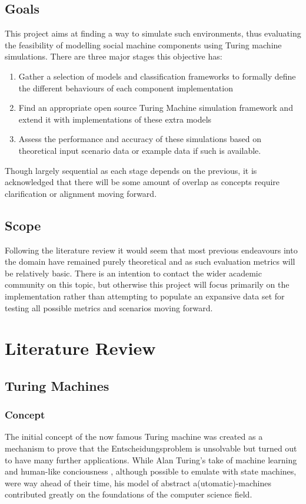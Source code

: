 \documentclass[12pt,a4,xcolor=table]{article}
\begin{document}
\subsection{Goals}
This project aims at finding a way to simulate such environments, thus evaluating the feasibility of modelling social machine components using Turing machine simulations.
There are three major stages this objective has:
\begin{enumerate}[label=\textit{Stage \arabic*}]
	\item Gather a selection of models and classification frameworks to formally define the different behaviours of each component implementation
	\item Find an appropriate open source Turing Machine simulation framework and extend it with implementations of these extra models
	\item Assess the performance and accuracy of these simulations based on theoretical input scenario data or example data if such is available.
\end{enumerate}
Though largely sequential as each stage depends on the previous, it is acknowledged that there will be some amount of overlap as concepts require clarification or alignment moving forward.

\subsection{Scope}
Following the literature review it would seem that most previous endeavours into the domain have remained purely theoretical and as such evaluation metrics will be relatively basic. There is an intention to contact the wider academic community on this topic, but otherwise this project will focus primarily on the implementation rather than attempting to populate an expansive data set for testing all possible metrics and scenarios moving forward.

\newpage
\section{Literature Review}
\subsection{Turing Machines}
\subsubsection{Concept}
The initial concept of the now famous Turing machine was created as a mechanism to prove that the Entscheidungsproblem is unsolvable \cite{Turing1936} but turned out to have many further applications. While Alan Turing's take of machine learning \cite{Turing1969} %
and human-like conciousness \cite{Turing1950}, although possible to emulate with state machines, were way ahead of their time, his model of abstract a(utomatic)-machines contributed greatly on the foundations of the computer science field.
\end{document}

